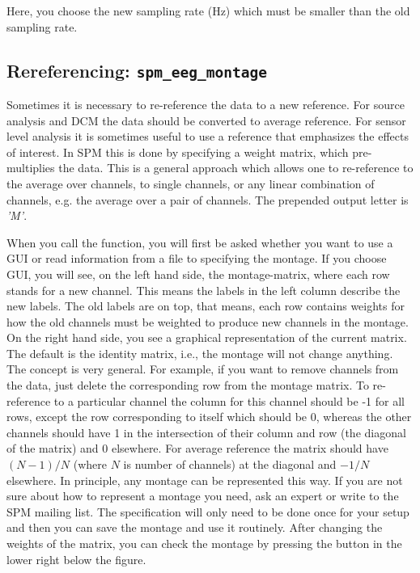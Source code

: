 Here, you choose the new sampling rate (Hz) which must be smaller than the old sampling rate.

\subsection{Rereferencing: \texttt{spm\_eeg\_montage}}
Sometimes it is necessary to re-reference the data to a new reference. For source analysis and DCM the data should be converted to average reference. For sensor level analysis it is sometimes useful to use a reference that emphasizes the effects of interest. In SPM this is done by specifying a weight matrix, which pre-multiplies the data. This is a general approach which allows one to re-reference to the average over channels, to single channels, or any linear combination of channels, e.g. the average over a pair of channels. The prepended output letter is \textit{'M'}. 

When you call the function, you will first be asked whether you want to use a GUI or read information from a file to specifying the montage. If you choose GUI, you will see, on the left hand side, the montage-matrix, where each row stands for a new channel. This means the labels in the left column describe the new labels. The old labels are on top, that means, each row contains weights for how the old channels must be weighted to produce new channels in the montage. On the right hand side, you see a graphical representation of the current matrix. The default is the identity matrix, i.e., the montage will not change anything. The concept is very general. For example, if you want to remove channels from the data, just delete the corresponding row from the montage matrix. To re-reference to a particular channel the column for this channel should be -1 for all rows, except the row corresponding to itself which should be 0, whereas the other channels should have 1 in the intersection of their column and row (the diagonal of the matrix) and 0 elsewhere. For average reference the matrix should have $(N-1)/N$ (where $N$ is number of channels) at the diagonal and $-1/N$ elsewhere. In principle, any montage can be represented this way. If you are not sure about how to represent a montage you need, ask an expert or write to the SPM mailing list. The specification will only need to be done once for your setup and then you can save the montage and use it routinely. After changing the weights of the matrix, you can check the montage by pressing the button in the lower right below the figure.

